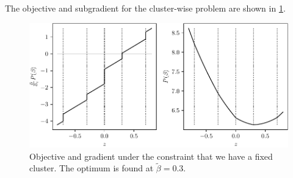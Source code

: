 The objective and subgradient for the cluster-wise problem are shown in
\cref{fig:cluster-grad-obj}.

\begin{figure}[htbp]
  \centering
  \includegraphics[]{figures/clusterupdate-grad-obj}
  \caption{%
    Objective and gradient under the constraint that we have a fixed
    cluster.
    The optimum is found at \(\tilde\beta = 0.3\).
  }%
  \label{fig:cluster-grad-obj}
\end{figure}

